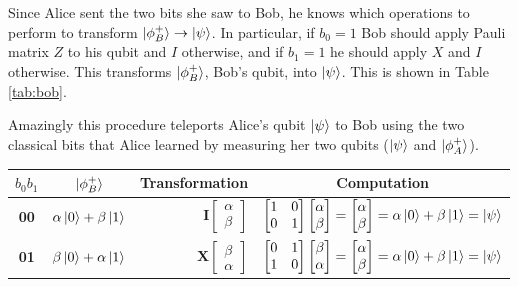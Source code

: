 \documentclass{article}
\theoremstyle{definition}
\begin{document}
\bigskip
\noindent
Since Alice sent the two bits she saw to Bob, he knows which
operations to perform to transform $\ket{\phi^{+}_B} \rightarrow
\ket{\psi}$.  In particular, if $b_0 = 1$ Bob should apply Pauli
matrix $Z$ to his qubit and $I$ otherwise, and if $b_1 = 1$ he
should apply $X$ and $I$ otherwise. This transforms
$\ket{\phi^{+}_B}$, Bob's qubit, into $\ket{\psi}$.  This is
shown in Table \ref{tab:bob}.

\bigskip
\noindent
Amazingly  this procedure teleports Alice's qubit $\ket{\psi}$ to
Bob using the two classical bits that Alice learned by measuring
her two qubits ($\ket{\psi}$ and $\ket{\phi^{+}_A}$).   

\bigskip
\begin{table}[H]
\centering
\begin{tabular}{c | c | r | r}
$b_{0} b_{1}$  & $\ket{\phi^{+}_B}$  & \multicolumn{1}{c|}{Transformation} & \multicolumn{1}{c}{Computation}  \\
\hline
\textbf{00}  & $\alpha \ket{0} + \beta \ket{1}$ & $\mathbf{I} \begin{bmatrix} \alpha \\ \beta \end{bmatrix}$ & $\begin{bmatrix} 1 & 0 \\ 0 & 1 \end{bmatrix} 
 \begin{bmatrix} \alpha \\ \beta \end{bmatrix}  = \begin{bmatrix} \alpha \\  \beta  \end{bmatrix} = \alpha \ket{0} + \beta \ket{1} = \ket{\psi}$  \\
\textbf{01}  & $\beta \ket{0} + \alpha \ket{1}$ & $\mathbf{X}\begin{bmatrix} \beta \\ \alpha  \end{bmatrix}$ & $ \begin{bmatrix} 0 & 1 \\ 1 & 0 \end{bmatrix}  \begin{bmatrix} \beta \\ \alpha  \end{bmatrix} 
= \begin{bmatrix} \alpha \\  \beta  \end{bmatrix}  = \alpha \ket{0} + \beta \ket{1} = \ket{\psi}$ \\

\end{tabular}
\end{table}
\end{document}
